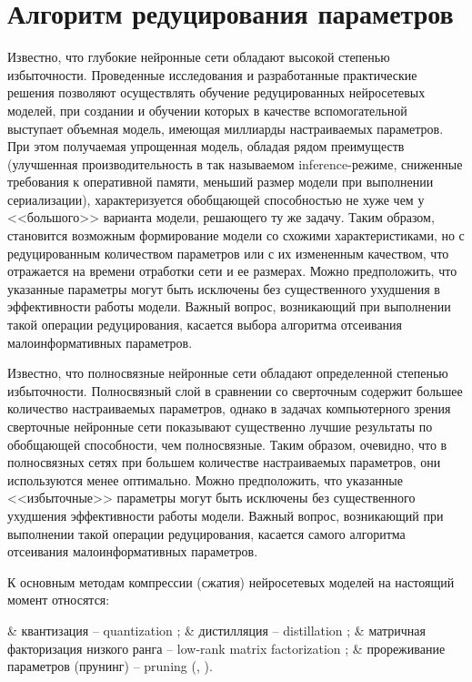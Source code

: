 \section{Алгоритм редуцирования параметров}
Известно, что глубокие нейронные сети обладают высокой степенью
избыточности. Проведенные исследования и разработанные практические решения
позволяют осуществлять обучение редуцированных нейросетевых моделей, при
создании и обучении которых в качестве вспомогательной выступает объемная модель, имеющая миллиарды настраиваемых параметров. При этом
получаемая упрощенная модель, обладая рядом преимуществ (улучшенная производительность в так называемом inference-режиме, сниженные требования к оперативной памяти,
меньший размер модели при выполнении сериализации), характеризуется обобщающей способностью не хуже чем у <<большого>> варианта модели, решающего ту же задачу.
Таким образом, становится возможным формирование модели со схожими характеристиками, но с редуцированным количеством параметров или с их
измененным качеством, что отражается на времени отработки сети и ее размерах.
Можно предположить, что указанные параметры могут быть исключены без
существенного ухудшения в эффективности работы модели. Важный вопрос,
возникающий при выполнении такой операции редуцирования, касается выбора
алгоритма отсеивания малоинформативных параметров.

Известно, что полносвязные нейронные сети обладают определенной степенью избыточности. Полносвязный слой в сравнении со сверточным содержит большее количество настраиваемых параметров, однако в задачах компьютерного зрения сверточные нейронные сети показывают существенно лучшие результаты по обобщающей способности, чем полносвязные. Таким образом, очевидно, что в полносвязных сетях при большем количестве настраиваемых параметров, они используются менее оптимально. Можно предположить, что указанные <<избыточные>> параметры могут быть исключены без существенного ухудшения эффективности работы модели. Важный вопрос, возникающий при выполнении такой операции редуцирования, касается самого алгоритма отсеивания малоинформативных параметров.

К основным методам компрессии (сжатия) нейросетевых моделей на настоящий момент относятся:
\begin{easylistNum}
	& квантизация -- quantization \cite{hubara2016quantized};
	& дистилляция -- distillation \cite{Hinton2015DistillingTK};
	& матричная факторизация низкого ранга -- low-rank matrix factorization \cite{Sainath2013};
	& прореживание параметров (прунинг) -- pruning (\cite{wang2019pruning}, \cite{xu2020}).
\end{easylistNum}

